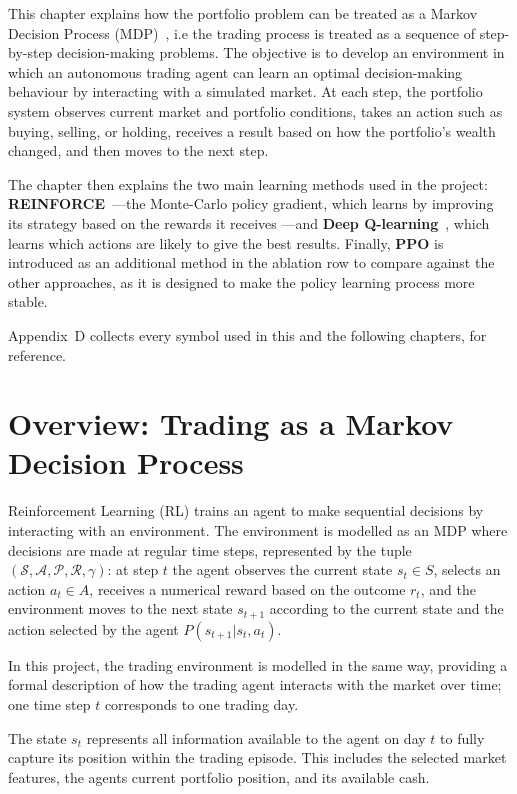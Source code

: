 This chapter explains how the portfolio problem can be treated as a
Markov Decision Process (MDP)~\cite{bellman1957, sutton2018}, i.e the trading process is treated as a
sequence of step-by-step decision-making problems. The objective is to
develop an environment in which an autonomous trading agent can learn an
optimal decision-making behaviour by interacting with a simulated
market. At each step, the portfolio system observes current market and
portfolio conditions, takes an action such as buying, selling, or
holding, receives a result based on how the portfolio's wealth changed,
and then moves to the next step.

The chapter then explains the two main learning methods used in the
project: \textbf{REINFORCE}~\cite{williams1992}---the Monte-Carlo policy gradient, which
learns by improving its strategy based on the rewards it receives ---and
\textbf{Deep Q-learning}~\cite{watkins1992, mnih2015}, which learns which actions are likely to give
the best results. Finally, \textbf{PPO} is introduced as an additional
method in the ablation row to compare against the other approaches, as
it is designed to make the policy learning process more stable.

Appendix~D collects every symbol used in this and the following
chapters, for reference.

\section{Overview: Trading as a Markov Decision Process}

Reinforcement Learning (RL) trains an agent to make sequential decisions
by interacting with an environment. The environment is modelled as an
MDP where decisions are made at regular time steps, represented by the
tuple~\(\left( \mathcal{S},\mathcal{A},\mathcal{P},\mathcal{R},\gamma \right)\):
at step \(t\) the agent observes the current state \(s_{t} \in S\),
selects an action \(a_{t} \in A\), receives a numerical reward based on
the outcome \(r_{t}\), and the environment moves to the next state
\(s_{t + 1}\) according to the current state and the action selected by
the agent \(P(s_{t + 1}|s_{t},a_{t})\).

In this project, the trading environment is modelled in the same way,
providing a formal description of how the trading agent interacts with
the market over time; one time step \(t\) corresponds to one trading
day.

The state \(s_{t}\) represents all information available to the agent on
day \(t\) to fully capture its position within the trading episode. This
includes the selected market features, the agent\textquotesingle s
current portfolio position, and its available cash.


